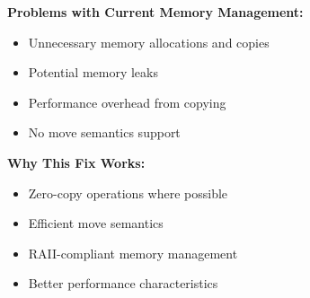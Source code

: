 \documentclass[11pt,a4paper]{article}
\begin{document}
\textcolor{problemred}{\textbf{Problems with Current Memory Management:}}
\begin{itemize}
    \item Unnecessary memory allocations and copies
    \item Potential memory leaks
    \item Performance overhead from copying
    \item No move semantics support
\end{itemize}

\textcolor{solutiongreen}{\textbf{Why This Fix Works:}}
\begin{itemize}
    \item Zero-copy operations where possible
    \item Efficient move semantics
    \item RAII-compliant memory management
    \item Better performance characteristics
\end{itemize}
\end{document}
